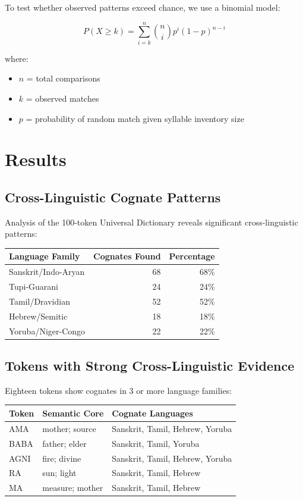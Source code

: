 \documentclass[12pt,a4paper]{article}
\begin{document}
To test whether observed patterns exceed chance, we use a binomial model:

\[
P(X \geq k) = \sum_{i=k}^{n} \binom{n}{i} p^i (1-p)^{n-i}
\]

where:
\begin{itemize}
    \item $n$ = total comparisons
    \item $k$ = observed matches
    \item $p$ = probability of random match given syllable inventory size
\end{itemize}

\section{Results}

\subsection{Cross-Linguistic Cognate Patterns}

Analysis of the 100-token Universal Dictionary reveals significant cross-linguistic patterns:

\begin{center}
\begin{tabular}{lrr}
\toprule
\textbf{Language Family} & \textbf{Cognates Found} & \textbf{Percentage} \\
\midrule
Sanskrit/Indo-Aryan & 68 & 68\% \\
Tupi-Guarani & 24 & 24\% \\
Tamil/Dravidian & 52 & 52\% \\
Hebrew/Semitic & 18 & 18\% \\
Yoruba/Niger-Congo & 22 & 22\% \\
\bottomrule
\end{tabular}
\end{center}

\subsection{Tokens with Strong Cross-Linguistic Evidence}

Eighteen tokens show cognates in 3 or more language families:

\begin{center}
\begin{longtable}{llp{5cm}}
\toprule
\textbf{Token} & \textbf{Semantic Core} & \textbf{Cognate Languages} \\
\midrule
AMA & mother; source & Sanskrit, Tamil, Hebrew, Yoruba \\
BABA & father; elder & Sanskrit, Tamil, Yoruba \\
AGNI & fire; divine & Sanskrit, Tamil, Hebrew, Yoruba \\
RA & sun; light & Sanskrit, Tamil, Hebrew \\
MA & measure; mother & Sanskrit, Tamil, Hebrew \\
\bottomrule
\end{longtable}
\end{center}
\end{document}
